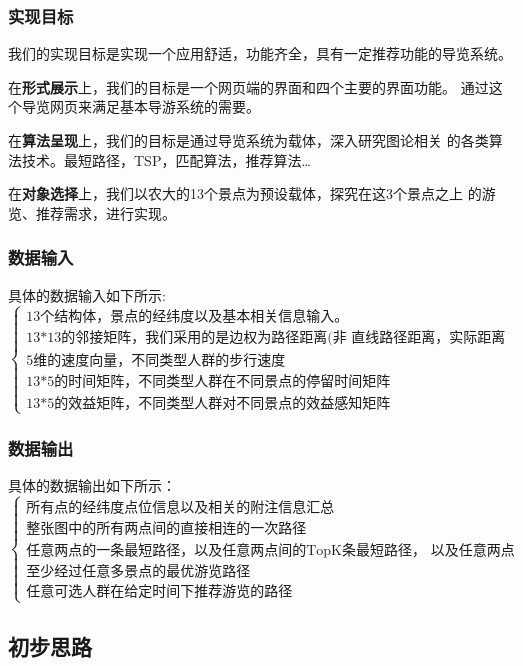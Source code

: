 \documentclass[withoutpreface,bwprint]{cumcmthesis} %
\begin{document}
\subsubsection{实现目标}
我们的实现目标是实现一个应用舒适，功能齐全，具有一定推荐功能的导览系统。

在\textbf{形式展示}上，我们的目标是一个网页端的界面和四个主要的界面功能。
通过这个导览网页来满足基本导游系统的需要。

在\textbf{算法呈现}上，我们的目标是通过导览系统为载体，深入研究图论相关
的各类算法技术。最短路径，TSP，匹配算法，推荐算法\dots

在\textbf{对象选择}上，我们以农大的13个景点为预设载体，探究在这3个景点之上
的游览、推荐需求，进行实现。


\subsubsection{数据输入}
\noindent 具体的数据输入如下所示:
\[
\begin{cases}
    \text{13个结构体，景点的经纬度以及基本相关信息输入。}\\
    \text{13*13的邻接矩阵，我们采用的是边权为路径距离(非
    直线路径距离，实际距离的矩阵模式)。}\\
    \text{5维的速度向量，不同类型人群的步行速度} \\
    \text{13*5的时间矩阵，不同类型人群在不同景点的停留时间矩阵} \\
    \text{13*5的效益矩阵，不同类型人群对不同景点的效益感知矩阵}
\end{cases}
\]

\subsubsection{数据输出}
\noindent 具体的数据输出如下所示：
\[
\begin{cases}
    \text{所有点的经纬度点位信息以及相关的附注信息汇总}\\
    \text{整张图中的所有两点间的直接相连的一次路径}\\
    \text{任意两点的一条最短路径，以及任意两点间的TopK条最短路径，
    以及任意两点间的全部路径}\\
    \text{至少经过任意多景点的最优游览路径}\\
    \text{任意可选人群在给定时间下推荐游览的路径}
\end{cases}
\]

\subsection{初步思路}
\end{document}
